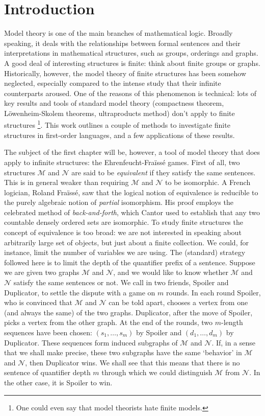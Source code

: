 \chapter{Introduction}

Model theory is one of the main branches of mathematical logic. 
Broadly speaking, it deals with the relationships between formal sentences and their interpretations in mathematical structures, such as groups, orderings and graphs. 
A good deal of interesting structures is finite: think about finite groups or graphs. 
Historically, however, the model theory of finite structures has been somehow neglected, especially compared to the intense study that their infinite counterparts aroused. 
One of the reasons of this phenomenon is technical: lots of key results and tools of standard model theory (compactness theorem, L\"owenheim-Skolem theorems, ultraproducts method) don't apply to finite structures
\footnote{One could even say that model theorists hate finite models.}. 
This work outlines a couple of methods to investigate finite structures in first-order languages, and a few applications of these results.

The subject of the first chapter will be, however, a tool of model theory that does apply to infinite structures: the Ehrenfeucht-Fra\"iss\'e games. 
First of all, two structures $\mathcal{M}$ and $\mathcal{N}$ are said to be \emph{equivalent} if they satisfy the same sentences. 
This is in general weaker than requiring $\mathcal{M}$ and $\mathcal{N}$ to be isomorphic. 
A French logician, Roland Fra\"iss\'e, saw that the logical notion of equivalence is reducible to the purely algebraic notion of \emph{partial} isomorphism. 
His proof employs the celebrated method of \emph{back-and-forth}, which Cantor used to establish that any two countable densely ordered sets are isomorphic. 
To study finite structures the concept of equivalence is too broad: we are not interested in speaking about arbitrarily large set of objects, but just about a finite collection. 
We could, for instance, limit the number of variables we are using. 
The (standard) strategy followed here is to limit the depth of the quantifier prefix of a sentence. 
Suppose we are given two graphs $\mathcal{M}$ and $\mathcal{N}$, and we would like to know whether $\mathcal{M}$ and $\mathcal{N}$ satisfy the same sentences or not. 
We call in two friends, Spoiler and Duplicator, to settle the dispute with a game on $m$ rounds. 
In each round Spoiler, who is convinced that $\mathcal{M}$ and $\mathcal{N}$ can be told apart, chooses a vertex from one (and always the same) of the two graphs. 
Duplicator, after the move of Spoiler, picks a vertex from the other graph. 
At the end of the rounds, two $m$-length sequences have been chosen: $(s_1, \ldots, s_m)$ by Spoiler and $(d_1, \ldots, d_m)$ by Duplicator. 
These sequences form induced subgraphs of $\mathcal{M}$ and $\mathcal{N}$. 
If, in a sense that we shall make precise, these two subgraphs have the same `behavior' in $\mathcal{M}$ and $\mathcal{N}$, then Duplicator wins. 
We shall see that this means that there is no sentence of quantifier depth $m$ through which we could distinguish $\mathcal{M}$ from $\mathcal{N}$. 
In the other case, it is Spoiler to win. 


